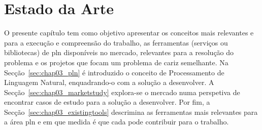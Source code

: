 \chapter{Estado da Arte}
\label{chap:Chapter3}

O presente capítulo tem como objetivo apresentar os conceitos mais relevantes e para a execução e compreensão do trabalho, as ferramentas (serviços ou bibliotecas) de \gls{pln} disponíveis no mercado, relevantes para a resolução do problema e os projetos que focam um problema de cariz semelhante. Na Secção~\ref{sec:chap03_pln} é introduzido o conceito de Processamento de Linguagem Natural, enquadrando-o com a solução a desenvolver. A Secção~\ref{sec:chap03_marketstudy} explora-se o mercado numa perspetiva de encontrar casos de estudo para a solução a desenvolver. Por fim, a Secção~\ref{sec:chap03_existingtools} descrimina as ferramentas mais relevantes para a área \gls{pln} e em que medida é que cada pode contribuir para o trabalho. 






